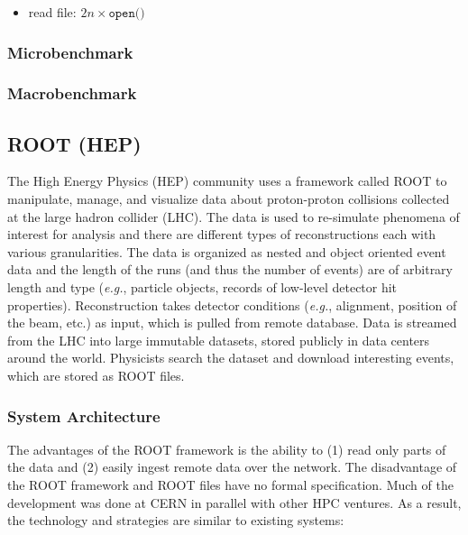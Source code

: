 \begin{itemize}
  \item read file: \(2n \times \texttt{open()}\) 
\end{itemize}

\subsubsection{Microbenchmark}
\subsubsection{Macrobenchmark}

\subsection{ROOT (HEP)}

The High Energy Physics (HEP) community uses a framework called ROOT to
manipulate, manage, and visualize data about proton-proton collisions
collected at the large hadron collider (LHC). The data is used to re-simulate
phenomena of interest for analysis and there are different types of
reconstructions each with various granularities. The data is organized as
nested and object oriented event data and the length of the runs (and thus
the number of events) are of arbitrary length and type ({\it e.g.},
particle objects, records of low-level detector hit properties).
Reconstruction takes detector conditions ({\it e.g.}, alignment, position of
the beam, etc.) as input, which is pulled from remote database.  Data is
streamed from the LHC into large immutable datasets, stored publicly in
data centers around the world.  Physicists search the dataset and download
interesting events, which are stored as ROOT files. 

\subsubsection{System Architecture}

The advantages of the ROOT framework is the ability to (1) read only parts
of the data and (2) easily ingest remote data over the network. The
disadvantage of the ROOT framework and ROOT files have no formal
specification. Much of the development was done at CERN in parallel with
other HPC ventures. As a result, the technology and strategies are similar
to existing systems:

